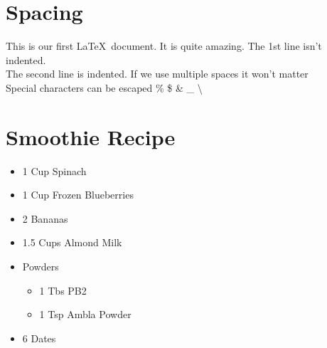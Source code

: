 \documentclass[a4paper,12pt]{book}
\begin{document}
\blindtext
 
\endgroup
 
 
\section*{Spacing}
 
 
 
This is our first \LaTeX\ document. It is quite amazing. The 1st line isn't indented.\\
 
The second line is indented. If      we     use    multiple spaces     it    won't    matter\\[10pt]
 
 
 
\noindent Special characters can be escaped \% \$ \& \_ \textbackslash
 
 
 
 
 
 
 
 
 
\section[Smoothie]{Smoothie Recipe}
\begin{itemize}
	\item 1 Cup Spinach
	\item 1 Cup Frozen Blueberries
	\item 2 Bananas
	\item 1.5 Cups Almond Milk
	\item Powders
	\begin{itemize}
		\item 1 Tbs PB2
		\item 1 Tsp Ambla Powder
	\end{itemize}
	\item 6 Dates
\end{itemize}
 
\end{document}
